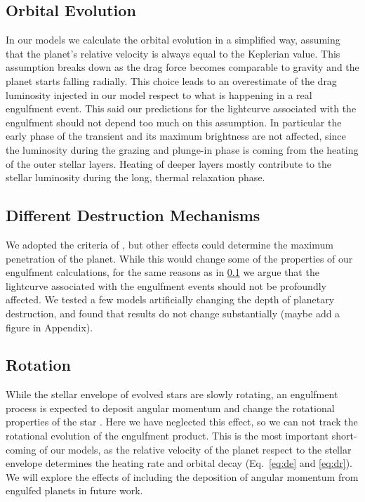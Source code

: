 \documentclass[twocolumn]{aastex62}
\begin{document}
\subsection{Orbital Evolution}\label{sec:orbital_evolution}
 In our models we calculate the orbital evolution in a simplified way, assuming that the planet's relative velocity is always equal to the Keplerian value. This assumption breaks down as the drag force becomes comparable to gravity and the planet starts falling radially. This choice leads to an overestimate of the drag luminosity injected in our model respect to what is happening in a real engulfment event. This said our predictions for the lightcurve associated with the engulfment should not depend too much on this assumption. In particular the early phase of the transient and its maximum brightness are not affected, since  the luminosity  during the grazing and plunge-in phase is coming from the heating of the outer stellar layers. Heating of deeper layers mostly contribute to the stellar luminosity during the long, thermal relaxation phase. 
 
\subsection{Different Destruction Mechanisms}
We adopted the criteria of \citet{Jia_2018}, but other effects could determine the maximum penetration of the planet. While this would change some of the properties of our engulfment calculations, for the same reasons as in \ref{sec:orbital_evolution} we argue that the lightcurve associated with the engulfment events should not be profoundly affected. 
We tested a few models artificially changing the depth of planetary destruction, and found that results do not change substantially (maybe add a figure in Appendix).
\subsection{Rotation}
While the stellar envelope of evolved stars are slowly rotating, an engulfment process is expected to deposit angular momentum and change the rotational properties of the star \citep[see e.g.][]{Privitera:2016a,Privitera:2016b}. Here we have neglected this effect, so we can not track the rotational evolution of the engulfment product. This is the most important short-coming of our models, as the relative velocity of the planet respect to the stellar envelope determines the heating rate and orbital decay (Eq.~\ref{eq:de} and \ref{eq:dr}). We will explore the effects of including the deposition of angular momentum from engulfed planets in future work. 
\end{document}
